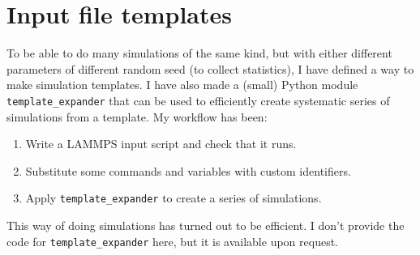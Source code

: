 \chapter{Input file templates}
\label{ch:templates}
To be able to do many simulations of the same kind, but with either different parameters of different random seed (to collect statistics), I have defined a way to make simulation templates. I have also made a (small) Python module {\tt template\_expander} that can be used to efficiently create systematic series of simulations from a template. My workflow has been: 

\begin{enumerate}
\item Write a LAMMPS input script and check that it runs.
\item Substitute some commands and variables with custom identifiers.
\item Apply {\tt template\_expander} to create a series of simulations.
\end{enumerate}
This way of doing simulations has turned out to be efficient. I don't provide the code for {\tt template\_expander} here, but it is available upon request.

